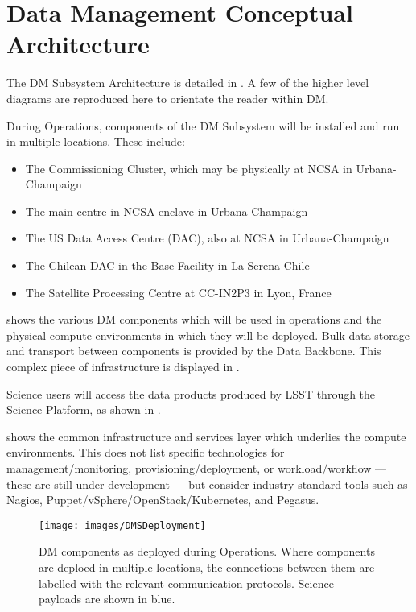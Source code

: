 \section{Data Management Conceptual Architecture \label{sect:dmarc}}

The DM Subsystem Architecture is detailed in .
A few of the higher level diagrams are reproduced here to orientate the reader within DM.

During Operations, components of the DM Subsystem will be installed and run in
multiple locations. These include:

\begin{itemize}
\item The Commissioning Cluster, which may be physically at NCSA in Urbana-Champaign
\item The main centre in NCSA enclave in Urbana-Champaign
\item The US Data Access Centre (DAC), also at NCSA in Urbana-Champaign
\item The Chilean DAC in the Base Facility in La Serena Chile
\item The Satellite Processing Centre at CC-IN2P3 in Lyon, France
\end{itemize}

 shows the various DM components which will be used in operations and the physical compute environments in which they will be deployed.
Bulk data storage and transport between components is provided by the Data Backbone. This complex piece of infrastructure is displayed in .

Science users will access the data products produced by LSST through the
Science Platform, as shown in .

 shows the common infrastructure and services layer which underlies the compute environments.
This does not list specific technologies for management/monitoring, provisioning/deployment, or workload/workflow --- these are still under development --- but consider industry-standard tools such as Nagios, Puppet/vSphere/OpenStack/Kubernetes, and Pegasus.

\begin{figure}[htbp]
\begin{center}
\texttt{[image: images/DMSDeployment]}
\caption{DM components as deployed during Operations. Where components are
deploed in multiple locations, the connections between them are labelled with
the relevant communication protocols. Science payloads are shown in blue.
\label{fig:dmsdeploy}}
\end{center}
\end{figure}


